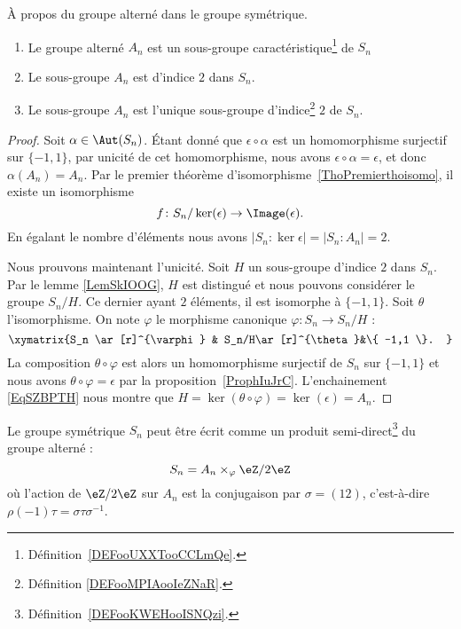 \begin{proposition} \label{PROPooCPXOooVxPAij}
	À propos du groupe alterné dans le groupe symétrique.
	\begin{enumerate}
		\item
		      Le groupe alterné \( A_n\) est un sous-groupe caractéristique\footnote{Définition~\ref{DEFooUXXTooCCLmQe}.} de \( S_n\)
		\item   \label{ITEMooWXXUooOWvFgE}
		      Le sous-groupe \( A_n\) est d'indice \( 2\) dans \( S_n\).
		\item       \label{ITEMooGGAHooRYgNqq}
		      Le sous-groupe \( A_n\) est l'unique sous-groupe d'indice\footnote{Définition \ref{DEFooMPIAooIeZNaR}.} \( 2\) de \( S_n\).
	\end{enumerate}
\end{proposition}

\begin{proof}
	Soit \( \alpha\in \Aut(S_n)\). Étant donné que \( \epsilon\circ\alpha\) est un homomorphisme surjectif sur \( \{ -1,1 \}\), par unicité de cet homomorphisme, nous avons \( \epsilon\circ\alpha=\epsilon\), et donc \( \alpha(A_n)=A_n\). Par le premier théorème d'isomorphisme~\ref{ThoPremierthoisomo}, il existe un isomorphisme
	\begin{equation}
		f\colon S_n/\ker(\epsilon)\to \Image(\epsilon).
	\end{equation}
	En égalant le nombre d'éléments nous avons \( | S_n:\ker\epsilon |=| S_n:A_n |=2\).

	Nous prouvons maintenant l'unicité. Soit \( H\) un sous-groupe d'indice \( 2\) dans \( S_n\). Par le lemme \ref{LemSkIOOG}, \( H\) est distingué et nous pouvons considérer le groupe \( S_n/H\). Ce dernier ayant \( 2\) éléments, il est isomorphe à \( \{ -1,1 \}\). Soit \( \theta\) l'isomorphisme. On note \( \varphi\) le morphisme canonique \( \varphi\colon S_n\to S_n/H\) :
	\begin{equation}    \label{EqSZBPTH}
		\xymatrix{%
			S_n \ar[r]^{\varphi}        &   S_n/H\ar[r]^{\theta}&\{ -1,1 \}.
		}
	\end{equation}
	La composition \( \theta \circ \varphi\) est alors un homomorphisme surjectif de \( S_n\) sur \( \{ -1,1 \}\) et nous avons \( \theta\circ\varphi=\epsilon\) par la proposition~\ref{ProphIuJrC}. L'enchainement \eqref{EqSZBPTH} nous montre que \( H=\ker(\theta\circ\varphi)=\ker(\epsilon)=A_n\).
\end{proof}

\begin{proposition}      \label{PROPooPSZVooSmAgPA}
	Le groupe symétrique \( S_n\) peut être écrit comme un produit semi-direct\footnote{Définition~\ref{DEFooKWEHooISNQzi}.} du groupe alterné :
	\begin{equation}
		S_n=A_n\times_{\varphi}\eZ/2\eZ
	\end{equation}
	où l'action de \( \eZ/2\eZ\) sur \( A_n\) est la conjugaison par \( \sigma=(12)\), c'est-à-dire \( \rho(-1)\tau=\sigma\tau\sigma^{-1}\).
\end{proposition}

